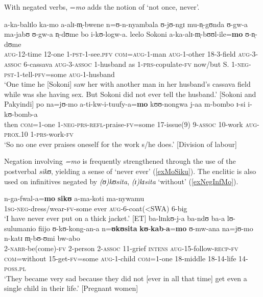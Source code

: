 With negated verbs, =\textit{mo} adds the notion of `not once, never'.
\begin{exe}
	\ex \gll a-ka-balɪlo ka-mo a-alɪ-m̩-bwene n=ʊ-n-nyambala ʊ-jʊ-ngɪ mu-n̩-gʊnda ʊ-gw-a ma-jabʊ ʊ-gw-a n̩-dʊme bo i-kʊ-logw-a. leelo Sokoni a-ka-alɪ-m̩-bʊʊl-ile=\textbf{mo} ʊ-n̩-dʊme\\
	\textsc{aug}-12-time 12-one 1-\textsc{pst}-1-see.\textsc{pfv} \textsc{com}=\textsc{aug}-1-man \textsc{aug}-1-other 18-3-field \textsc{aug}-3-\textsc{assoc} 6-cassava \textsc{aug}-3-\textsc{assoc} 1-husband as 1-\textsc{prs}-copulate-\textsc{fv} now/but S. 1-\textsc{neg}-\textsc{pst}-1-tell-\textsc{pfv}=some \textsc{aug}-1-husband\\
	\glt `‎‎One time he [Sokoni] saw her with another man in her husband's cassava field while was she having sex. But Sokoni did not ever tell the husband.' [Sokoni and Pakyindi]
	\ex \gll po na=jʊ-mo a-ti-kw-i-tuufy-a=\textbf{mo} kʊʊ-nongwa j-aa m-bombo ɪ-si i-kʊ-bomb-a\\
	then \textsc{com}=1-one 1-\textsc{neg}-\textsc{prs}-\textsc{refl}-praise-\textsc{fv}=some 17-issue(9) 9-\textsc{assoc} 10-work \textsc{aug}-\textsc{prox.10} 1-\textsc{prs}-work-\textsc{fv}\\
	\glt \lq So no one ever praises oneself for the work s/he does.' [Division of labour]
\end{exe}

Negation involving \textit{=mo} is frequently strengthened through the use of the postverbal \textit{sikʊ}, yielding a sense of `never ever' (\ref{exMoSiku}). The enclitic is also used on infinitives negated by \textit{(ʊ)kʊsita}, \textit{(ɪ)kɪsita} `without' (\ref{exNegInfMo}).
\begin{exe}
	\ex\label{exMoSiku}
	\gll n-ga-fwal-a=\textbf{mo} \textbf{sikʊ} a-ma-koti ma-nywamu\\
	\textsc{1sg}-\textsc{neg}-dress/wear-\textsc{fv}-some ever \textsc{aug}-6-coat(<SWA) 6-big\\
	\glt \lq I have never ever put on a thick jacket.' [ET]
	\ex \label{exNegInfMo}
	\gll ba-lɪnkʊ-j-a ba-ndʊ ba-a lʊ-sulumanio fiijo ʊ-kʊ-kong-an-a n=\textbf{ʊkʊsita} \textbf{kʊ}-\textbf{kab}-\textbf{a}=\textbf{mo} ʊ-mw-ana na=jʊ-mo n-katɪ m̩-bʊ-ʊmi bw-abo\\
	2-\textsc{narr}-be(come)-\textsc{fv} 2-person 2-\textsc{assoc} 11-grief \textsc{intens} \textsc{aug}-15-follow-\textsc{recp}-\textsc{fv} \textsc{com}=without 15-get-\textsc{fv}=some \textsc{aug}-1-child \textsc{com}=1-one 18-middle 18-14-life 14-\textsc{poss.pl}\\
	\glt `They became very sad because they did not [ever in all that time] get even a single child in their life.' [Pregnant women]
\end{exe}

